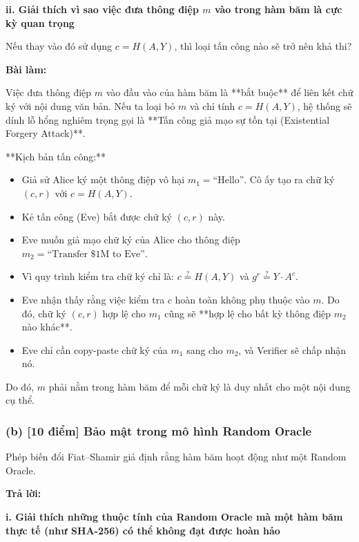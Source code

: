 \textbf{ii. Giải thích vì sao việc đưa thông điệp $m$ vào trong hàm băm là cực kỳ quan trọng}

Nếu thay vào đó sử dụng $c = H(A, Y)$, thì loại tấn công nào sẽ trở nên khả thi?

\textbf{Bài làm:}

Việc đưa thông điệp $m$ vào đầu vào của hàm băm là **bắt buộc** để liên kết chữ ký với nội dung văn bản. Nếu ta loại bỏ $m$ và chỉ tính $c = H(A, Y)$, hệ thống sẽ dính lỗ hổng nghiêm trọng gọi là **Tấn công giả mạo sự tồn tại (Existential Forgery Attack)**.

**Kịch bản tấn công:**
\begin{itemize}
    \item Giả sử Alice ký một thông điệp vô hại $m_1 = \text{``Hello''}$. Cô ấy tạo ra chữ ký $(c, r)$ với $c = H(A, Y)$.
    \item Kẻ tấn công (Eve) bắt được chữ ký $(c, r)$ này.
    \item Eve muốn giả mạo chữ ký của Alice cho thông điệp $m_2 = \text{``Transfer \$1M to Eve''}$.
    \item Vì quy trình kiểm tra chữ ký chỉ là: $c \stackrel{?}{=} H(A, Y)$ và $g^r \stackrel{?}{=} Y \cdot A^c$.
    \item Eve nhận thấy rằng việc kiểm tra $c$ hoàn toàn không phụ thuộc vào $m$. Do đó, chữ ký $(c, r)$ hợp lệ cho $m_1$ cũng sẽ **hợp lệ cho bất kỳ thông điệp $m_2$ nào khác**.
    \item Eve chỉ cần copy-paste chữ ký của $m_1$ sang cho $m_2$, và Verifier sẽ chấp nhận nó.
\end{itemize}
Do đó, $m$ phải nằm trong hàm băm để mỗi chữ ký là duy nhất cho một nội dung cụ thể.

\vspace{0.5cm}

\subsubsection{(b) [10 điểm] Bảo mật trong mô hình Random Oracle}

Phép biến đổi Fiat–Shamir giả định rằng hàm băm hoạt động như một Random Oracle.

\begin{center}
    \textbf{Trả lời:}
\end{center}

\textbf{i. Giải thích những thuộc tính của Random Oracle mà một hàm băm thực tế (như SHA-256) có thể không đạt được hoàn hảo}

